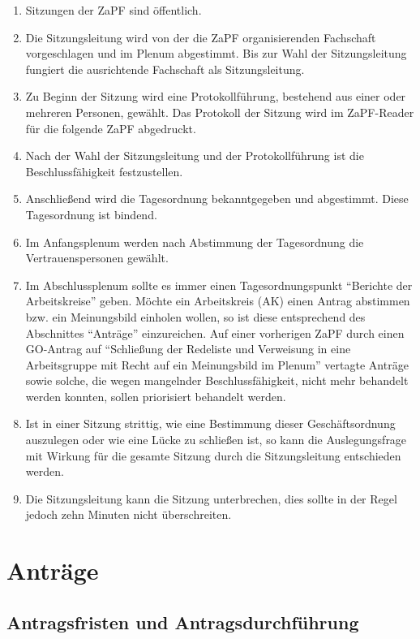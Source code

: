 \documentclass[
  a4paper,
  oneside]{scrartcl}
\providecommand{\tightlist}{%
  \setlength{\itemsep}{0pt}\setlength{\parskip}{0pt}}
\begin{document}
\begin{enumerate}
\def\labelenumi{\arabic{enumi}.}
\tightlist
\item
  Sitzungen der ZaPF sind öffentlich.
\item
  Die Sitzungsleitung wird von der die ZaPF organisierenden Fachschaft
  vorgeschlagen und im Plenum abgestimmt. Bis zur Wahl der
  Sitzungsleitung fungiert die ausrichtende Fachschaft als
  Sitzungsleitung.
\item
  Zu Beginn der Sitzung wird eine Protokollführung, bestehend aus einer
  oder mehreren Personen, gewählt. Das Protokoll der Sitzung wird im
  ZaPF-Reader für die folgende ZaPF abgedruckt.
\item
  Nach der Wahl der Sitzungsleitung und der Protokollführung ist die
  Beschlussfähigkeit festzustellen.
\item
  Anschließend wird die Tagesordnung bekanntgegeben und abgestimmt.
  Diese Tagesordnung ist bindend.
\item
  Im Anfangsplenum werden nach Abstimmung der Tagesordnung die
  Vertrauenspersonen gewählt.
\item
  Im Abschlussplenum sollte es immer einen Tagesordnungspunkt ``Berichte
  der Arbeitskreise'' geben. Möchte ein Arbeitskreis (AK) einen Antrag
  abstimmen bzw. ein Meinungsbild einholen wollen, so ist diese
  entsprechend des Abschnittes ``Anträge'' einzureichen. Auf einer
  vorherigen ZaPF durch einen GO-Antrag auf ``Schließung der Redeliste
  und Verweisung in eine Arbeitsgruppe mit Recht auf ein Meinungsbild im
  Plenum'' vertagte Anträge sowie solche, die wegen mangelnder
  Beschlussfähigkeit, nicht mehr behandelt werden konnten, sollen
  priorisiert behandelt werden.
\item
  Ist in einer Sitzung strittig, wie eine Bestimmung dieser
  Geschäftsordnung auszulegen oder wie eine Lücke zu schließen ist, so
  kann die Auslegungsfrage mit Wirkung für die gesamte Sitzung durch die
  Sitzungsleitung entschieden werden.
\item
  Die Sitzungsleitung kann die Sitzung unterbrechen, dies sollte in der
  Regel jedoch zehn Minuten nicht überschreiten.
\end{enumerate}

\hypertarget{antruxe4ge}{%
\section{Anträge}\label{antruxe4ge}}

\hypertarget{antragsfristen-und-antragsdurchfuxfchrung}{%
\subsection{Antragsfristen und
Antragsdurchführung}\label{antragsfristen-und-antragsdurchfuxfchrung}}
\end{document}
